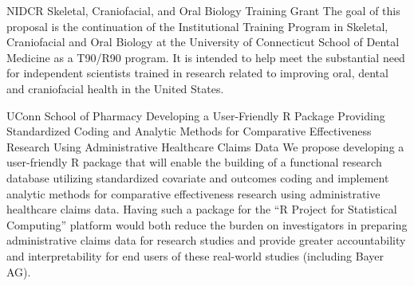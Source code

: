 \documentclass{nihbiosketch}
\begin{document}
{NIDCR}
{Skeletal, Craniofacial, and Oral Biology Training Grant}
{The goal of this proposal is the continuation of the Institutional Training Program in Skeletal, Craniofacial and Oral Biology at the University of Connecticut School of Dental Medicine as a T90/R90 program. It is intended to help meet the substantial need for independent scientists trained in research related to improving oral, dental and craniofacial health in the United States.}

\bigskip

{UConn School of Pharmacy}
{Developing a User-Friendly R Package Providing Standardized Coding and Analytic Methods for Comparative Effectiveness Research Using Administrative Healthcare Claims Data}
{We propose developing a user-friendly R package that will enable the building of a functional research database utilizing standardized covariate and outcomes coding and implement analytic methods for comparative effectiveness research using administrative healthcare claims data.  Having such a package for the ``R Project for Statistical Computing'' platform would both reduce the burden on investigators in preparing administrative claims data for research studies and provide greater accountability and interpretability for end users of these real-world studies (including Bayer AG).}
\end{document}
